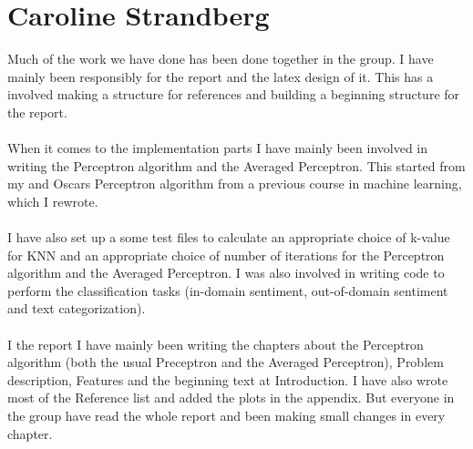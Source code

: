 \newpage
\section*{Caroline Strandberg}
Much of the work we have done has been done together in the group. 
I have mainly been responsibly for the report and the latex design of it. This has a involved making a structure for references and building a beginning structure for the report.   
\\\\
When it comes to the implementation parts I have mainly been involved in writing the Perceptron algorithm and the Averaged Perceptron. This started from my and Oscars Perceptron algorithm from a previous course in machine learning, which I rewrote. 
\\\\
I have also set up a some test files to calculate an appropriate choice of k-value for KNN and an appropriate choice of number of iterations for the Perceptron algorithm and the Averaged Perceptron. I was also involved in writing code to perform the classification tasks (in-domain sentiment, out-of-domain sentiment and text categorization).
\\\\
I the report I have mainly been writing the chapters about the Perceptron algorithm (both the usual Preceptron and the Averaged Perceptron), Problem description, Features and the beginning text at Introduction. I have also wrote most of the Reference list and added the plots in the appendix. But everyone in the group have read the whole report and been making small changes in every chapter. 
